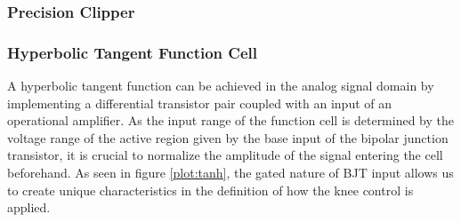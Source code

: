 \documentclass[10pt]{article}
\begin{document}
\begin{multicols*}{2}
                \subsubsection{Precision Clipper}

                    \noindent
                    \begin{minipage}{\linewidth}

                        \centering


                        \label{fig:knee-control}

                    \end{minipage}

                \subsubsection{Hyperbolic Tangent Function Cell}
                    A hyperbolic tangent function can be achieved in the analog signal domain by implementing a differential transistor pair coupled with an input of an operational amplifier.
                    As the input range of the function cell is determined by the voltage range of the active region given by the base input of the bipolar junction transistor, it is crucial to normalize the amplitude of the signal entering the cell beforehand. As seen in figure \ref{plot:tanh}, the gated nature of BJT input allows us to create unique characteristics in the definition of how the knee control is applied.


\end{multicols*}
\end{document}
